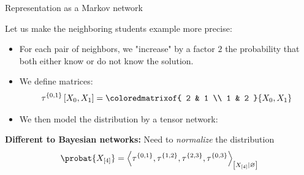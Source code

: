 \documentclass{beamer}
\begin{document}
    \begin{frame}{Representation as a Markov network}

        Let us make the neighboring students example more precise:
        \begin{itemize}
            \item For each pair of neighbors, we "increase" by a factor $2$ the probability that both either know or do not know the solution.
            \item We define matrices:
            \begin{align*}
                \hypercoreofat{\{0,1\}}{\catvariableof{0},\catvariableof{1}}
                =
                \coloredmatrixof{
                    2 & 1 \\ 1 & 2
                }{\catvariableof{0},\catvariableof{1}}
            \end{align*}
            \item         We then model the distribution by a tensor network:
            
        \end{itemize}





            {\bf Different to Bayesian networks:} Need to \emph{normalize} the distribution
        \begin{align*}
            \probat{\catvariableof{[4]}}
            = \normalizationof{
                \hypercoreof{\{0,1\}},%
                \hypercoreof{\{1,2\}},%
                \hypercoreof{\{2,3\}},%
                \hypercoreof{\{0,3\}}%
            }{\catvariableof{[4]}}
        \end{align*}


    \end{frame}
\end{document}
